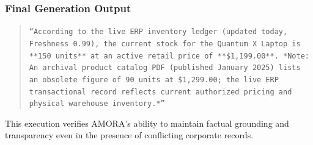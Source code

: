 \subsubsection{Final Generation Output}
\begin{quote}
    \texttt{``According to the live ERP inventory ledger (updated today, Freshness 0.99), the current stock for the Quantum X Laptop is **150 units** at an active retail price of **\$1,199.00**.\\
    *Note: An archival product catalog PDF (published January 2025) lists an obsolete figure of 90 units at \$1,299.00; the live ERP transactional record reflects current authorized pricing and physical warehouse inventory.*''}
\end{quote}
This execution verifies AMORA's ability to maintain factual grounding and transparency even in the presence of conflicting corporate records.
